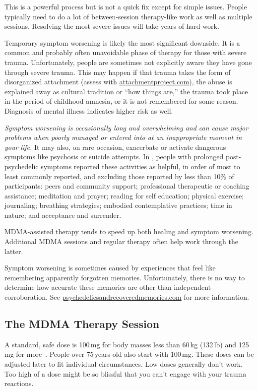 \documentclass[11pt,oneside]{book}
\newcommand{\mdcite}[1]{}
\begin{document}
This is a powerful process but is not a quick fix except for simple issues. People typically need to do a lot of between-session therapy-like work as well as multiple sessions. Resolving the most severe issues will take years of hard work.

Temporary symptom worsening is likely the most significant downside. It is a common and probably often unavoidable phase of therapy for those with severe trauma. Unfortunately, people are sometimes not explicitly aware they have gone through severe trauma. This may happen if that trauma takes the form of disorganized attachment (assess with \href{https://www.attachmentproject.com}{attachmentproject.com}), the abuse is explained away as cultural tradition or \enquote{how things are,} the trauma took place in the period of childhood amnesia, or it is not remembered for some reason. Diagnosis of mental illness indicates higher risk as well.

\textit{Symptom worsening is occasionally long and overwhelming and can cause major problems when poorly managed or entered into at an inappropriate moment in your life.} It may also, on rare occasion, exacerbate or activate dangerous symptoms like psychosis or suicide attempts. In \textcite{robinson2024coming}, people with prolonged post-psychedelic symptoms reported these activities as helpful, in order of most to least commonly reported, and excluding those reported by less than 10\% of participants: peers and community support; professional therapeutic or coaching assistance; meditation and prayer; reading for self education; physical exercise; journaling; breathing strategies; embodied contemplative practices; time in nature; and acceptance and surrender.

MDMA-assisted therapy tends to speed up both healing and symptom worsening. Additional MDMA sessions and regular therapy often help work through the latter.

Symptom worsening is sometimes caused by experiences that feel like remembering apparently forgotten memories. Unfortunately, there is no way to determine how accurate these memories are other than independent corroboration. See \href{https://psychedelicsandrecoveredmemories.com}{psychedelicsandrecoveredmemories.com} for more information.

\subsection*{The MDMA Therapy Session}
A standard, safe dose is 100\,mg for body masses less than 60\,kg (132\,lb) and 125\,mg for more~\mdcite{liechtiInteractions,baggottSupplements}. People over 75\,years old also start with 100\,mg. These doses can be adjusted later to fit individual circumstances. Low doses generally don't work. Too high of a dose might be so blissful that you can't engage with your trauma reactions.
\end{document}
